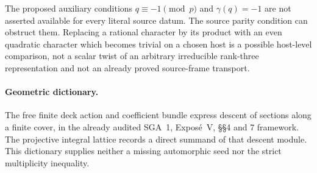 The proposed auxiliary conditions \(q\equiv-1\pmod p\) and
\(\gamma(q)=-1\) are not asserted available for every literal
source datum.  The source parity condition can obstruct them.
Replacing a rational character by its product with an even
quadratic character which becomes trivial on a chosen host
is a possible host-level comparison, not a scalar twist of
an arbitrary irreducible rank-three representation and not an
already proved source-frame transport.

\paragraph{Geometric dictionary.}
The free finite deck action and coefficient bundle express
descent of sections along a finite cover, in the already
audited SGA~1, Expos\'e~V, \S\S4 and 7 framework.  The
projective integral lattice records a direct summand of that
descent module.  This dictionary supplies neither a missing
automorphic seed nor the strict multiplicity inequality.
